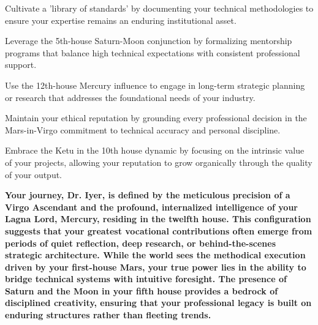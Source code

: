 \begin{diamondlist}
  \item {\fontsize{8.5}{12}\selectfont Cultivate a 'library of standards' by documenting your technical methodologies to ensure your expertise remains an enduring institutional asset.}
  \item {\fontsize{8.5}{12}\selectfont Leverage the 5th-house Saturn-Moon conjunction by formalizing mentorship programs that balance high technical expectations with consistent professional support.}
  \item {\fontsize{8.5}{12}\selectfont Use the 12th-house Mercury influence to engage in long-term strategic planning or research that addresses the foundational needs of your industry.}
  \item {\fontsize{8.5}{12}\selectfont Maintain your ethical reputation by grounding every professional decision in the Mars-in-Virgo commitment to technical accuracy and personal discipline.}
  \item {\fontsize{8.5}{12}\selectfont Embrace the Ketu in the 10th house dynamic by focusing on the intrinsic value of your projects, allowing your reputation to grow organically through the quality of your output.}
\end{diamondlist}


\label{topic72}

{\fontsize{9.5}{13.8}\selectfont\bfseries\color{DeepSlate} Your journey, Dr. Iyer, is defined by the meticulous precision of a Virgo Ascendant and the profound, internalized intelligence of your Lagna Lord, Mercury, residing in the twelfth house. This configuration suggests that your greatest vocational contributions often emerge from periods of quiet reflection, deep research, or behind-the-scenes strategic architecture. While the world sees the methodical execution driven by your first-house Mars, your true power lies in the ability to bridge technical systems with intuitive foresight. The presence of Saturn and the Moon in your fifth house provides a bedrock of disciplined creativity, ensuring that your professional legacy is built on enduring structures rather than fleeting trends.}\par\vspace{2mm}

